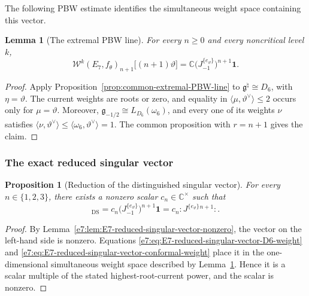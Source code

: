 \documentclass[11pt,reqno]{amsart}
\newtheorem{lemma}[theorem]{Lemma}
\newtheorem{proposition}[theorem]{Proposition}
\theoremstyle{definition}
\theoremstyle{remark}
\begin{document}
The following PBW estimate identifies the simultaneous weight space
containing this vector.

\begin{lemma}[The extremal PBW line]
\label{e7:lem:E7-extremal-PBW-line}
For every \(n\ge0\) and every noncritical level \(k\),
\begin{equation*}
  \mathcal W^k(E_7,f_\theta)_{n+1}
  \bigl[(n+1)\vartheta\bigr]
  =
  \mathbb C
  \bigl(J^{\{e_\vartheta\}}_{-1}\bigr)^{n+1}\mathbf1.
\end{equation*}
\end{lemma}

\begin{proof}
Apply Proposition~\ref{prop:common-extremal-PBW-line} to
\(\mathfrak g^\natural\cong D_6\), with \(\eta=\vartheta\).  The current
weights are roots or zero, and equality in
\(\langle\mu,\vartheta^\vee\rangle\le2\) occurs only for
\(\mu=\vartheta\).  Moreover,
\(\mathfrak g_{-1/2}\cong L_{D_6}(\omega_6)\), and every one of its weights
\(\nu\) satisfies
\(\langle\nu,\vartheta^\vee\rangle\le
\langle\omega_6,\vartheta^\vee\rangle=1\).  The common proposition with
\(r=n+1\) gives the claim.
\end{proof}

\subsubsection{The exact reduced singular vector}


\begin{proposition}[Reduction of the distinguished singular vector]
\label{e7:prop:E7-reduction-distinguished-singular-vector}
For every \(n\in\{1,2,3\}\), there exists a nonzero scalar
\(c_n\in\mathbb C^\times\) such that
\begin{equation*}
  [s_n]_{\mathrm{DS}}
  =c_n
   \bigl(J^{\{e_\vartheta\}}_{-1}\bigr)^{n+1}\mathbf1
  =c_n:J^{\{e_\vartheta\}}{}^{n+1}:.
\end{equation*}
\end{proposition}

\begin{proof}
By Lemma~\ref{e7:lem:E7-reduced-singular-vector-nonzero}, the vector on the
left-hand side is nonzero.  Equations
\eqref{e7:eq:E7-reduced-singular-vector-D6-weight} and
\eqref{e7:eq:E7-reduced-singular-vector-conformal-weight} place it in the
one-dimensional simultaneous weight space described by
Lemma~\ref{e7:lem:E7-extremal-PBW-line}.  Hence it is a scalar multiple of the
stated highest-root-current power, and the scalar is nonzero.
\end{proof}
\end{document}
